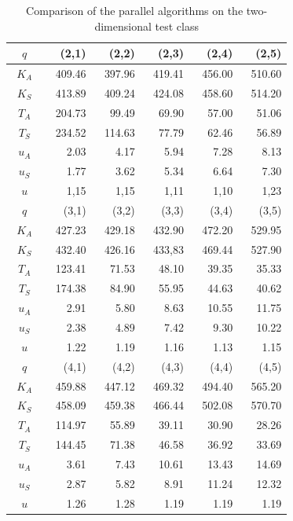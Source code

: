 \begin{table}
\caption{Comparison of the parallel algorithms on the two-dimensional test class}
\label {tab:5_1}
\begin{center}
\begin{tabular}{|c|r|r|r|r|r|}
\hline
$q$ & (2,1) & (2,2) & (2,3) & (2,4) & (2,5)   \\
\hline
$\ \ $$K_A\ \ $  &  $\ \ \ $409.46 & $\ \ \ $397.96 & $\ \ \ $419.41 & $\ \ \ $456.00 & $\ \ \ $510.60  \\
\hline
$K_S$  & 413.89 & 409.24 & 424.08 & 458.60 & 514.20  \\
\hline
$T_A$  & 204.73 &  99.49 &  69.90 &  57.00 &  51.06  \\
\hline
$T_S$  & 234.52 & 114.63 &  77.79 &  62.46 &  56.89  \\
\hline
$u_A$  &   2.03 &   4.17 &   5.94 &   7.28 &   8.13  \\  
\hline
$u_S$  &   1.77 &   3.62 &   5.34 &   6.64 &   7.30  \\
\hline
$u$    &   1,15 &   1,15 &   1,11 &   1,10 &   1,23  \\
\hline
\hline
$q$ & (3,1) & (3,2) & (3,3) & (3,4) & (3,5)   \\
\hline
$K_A$  & 427.23 & 429.18 & 432.90 & 472.20 & 529.95  \\
\hline
$K_S$  & 432.40 & 426.16 & 433,83 & 469.44 & 527.90  \\
\hline
$T_A$  & 123.41 &  71.53 &  48.10 &  39.35 &  35.33  \\
\hline
$T_S$  & 174.38 &  84.90 &  55.95 &  44.63 &  40.62  \\
\hline
$u_A$  &   2.91 &   5.80 &   8.63 &  10.55 &  11.75  \\
\hline
$u_S$  &   2.38 &   4.89 &   7.42 &   9.30 &  10.22  \\
\hline
$u$    &   1.22 &   1.19 &   1.16 &   1.13 &   1.15  \\
\hline
\hline
$q$ & (4,1) & (4,2) & (4,3) & (4,4) & (4,5)   \\
\hline
$K_A$  & 459.88 & 447.12 & 469.32 & 494.40 & 565.20  \\
\hline
$K_S$  & 458.09 & 459.38 & 466.44 & 502.08 & 570.70  \\
\hline
$T_A$  & 114.97 &  55.89 &  39.11 &  30.90 &  28.26  \\
\hline
$T_S$  & 144.45 &  71.38 &  46.58 &  36.92 &  33.69  \\
\hline
$u_A$  &   3.61 &   7.43 &  10.61 &  13.43 &  14.69  \\
\hline
$u_S$  &   2.87 &   5.82 &   8.91 &  11.24 &  12.32  \\
\hline
$u$    &   1.26 &   1.28 &   1.19 &   1.19 &   1.19  \\
\hline
\end{tabular}
\end{center}
\end{table}
